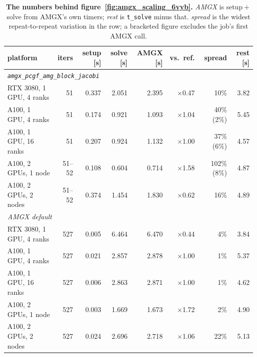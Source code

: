 \begin{table}[!htb]
\centering
\footnotesize
\setlength{\tabcolsep}{4.5pt}
\caption[AMGX scaling against the whole solve stage]{\textbf{The numbers behind
    figure~\ref{fig:amgx_scaling_6vyb}.} \emph{AMGX} is setup${}+{}$solve from AMGX's own
    timers; \emph{rest} is \texttt{t\_solve} minus that. \emph{spread} is the
    widest repeat-to-repeat variation in the row; a bracketed figure excludes
    the job's first AMGX call.}
\label{tab:amgx_scaling_6vyb}
\begin{tabular}{lrrrrrrr}
\toprule
platform & iters & setup [s] & solve [s] & AMGX [s] & vs.\ ref. & spread & rest [s] \\
\midrule
\multicolumn{8}{l}{\emph{\texttt{amgx\_pcgf\_amg\_block\_jacobi}}} \\
RTX 3080, 1 GPU, 4 ranks & 51 & 0.337 & 2.051 & 2.395 & $\times$0.47 & 10\% & 3.82 \\
A100, 1 GPU, 4 ranks & 51 & 0.174 & 0.921 & 1.093 & $\times$1.04 & 40\% (2\%) & 5.45 \\
A100, 1 GPU, 16 ranks & 51 & 0.207 & 0.924 & 1.132 & $\times$1.00 & 37\% (6\%) & 4.57 \\
A100, 2 GPUs, 1 node & 51--52 & 0.108 & 0.604 & 0.714 & $\times$1.58 & 102\% (8\%) & 4.87 \\
A100, 2 GPUs, 2 nodes & 51--52 & 0.374 & 1.454 & 1.830 & $\times$0.62 & 16\% & 4.89 \\
\midrule
\multicolumn{8}{l}{\emph{AMGX default}} \\
RTX 3080, 1 GPU, 4 ranks & 527 & 0.005 & 6.464 & 6.470 & $\times$0.44 & 4\% & 3.84 \\
A100, 1 GPU, 4 ranks & 527 & 0.021 & 2.857 & 2.878 & $\times$1.00 & 1\% & 5.37 \\
A100, 1 GPU, 16 ranks & 527 & 0.006 & 2.863 & 2.871 & $\times$1.00 & 1\% & 4.62 \\
A100, 2 GPUs, 1 node & 527 & 0.003 & 1.669 & 1.673 & $\times$1.72 & 2\% & 4.90 \\
A100, 2 GPUs, 2 nodes & 527 & 0.024 & 2.696 & 2.718 & $\times$1.06 & 22\% & 5.13 \\
\bottomrule
\end{tabular}
\end{table}
